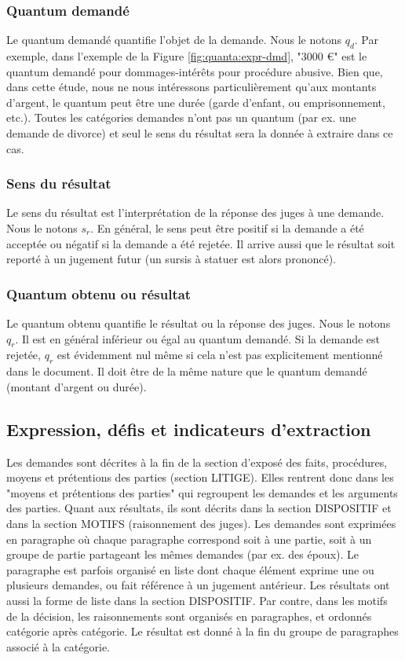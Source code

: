 \subsubsection{Quantum demandé}

Le quantum demandé quantifie l'objet de la demande. Nous le notons $q_d$. Par exemple, dans l'exemple de la Figure \ref{fig:quanta:expr-dmd}, "3000 \euro{}" est le quantum demandé pour dommages-intérêts pour procédure abusive. Bien que, dans cette étude, nous ne nous intéressons particulièrement qu'aux montants d'argent, le quantum peut être une durée (garde d'enfant, ou emprisonnement, etc.). Toutes les catégories demandes n'ont pas un quantum (par ex. une demande de divorce) et seul le sens du résultat sera la donnée à extraire dans ce cas.

\subsubsection{Sens du résultat}

Le sens du résultat est l'interprétation de la réponse des juges à une demande. Nous le notons $s_r$. En général, le sens peut être positif si la demande a été acceptée ou négatif si la demande a été rejetée. Il arrive aussi que le résultat soit reporté à un jugement futur (un sursis à statuer est alors prononcé). 

\subsubsection{Quantum obtenu ou résultat}

Le quantum obtenu quantifie le résultat ou la réponse des juges. Nous le notons $q_r$. Il est en général inférieur ou égal au quantum demandé. Si la demande est rejetée, 
$q_r$ est évidemment nul même si cela n'est pas explicitement mentionné dans le document. Il doit être de la même nature que le quantum demandé (montant d'argent ou durée).


\subsection{Expression, défis et indicateurs d'extraction}

Les demandes sont décrites à la fin de la section d'exposé des faits, procédures, moyens et prétentions des parties (section LITIGE). Elles rentrent donc dans les "moyens et prétentions des parties" qui regroupent les demandes et les arguments des parties. Quant aux résultats, ils sont décrits dans la section DISPOSITIF et dans la section MOTIFS (raisonnement des juges). Les demandes sont exprimées en paragraphe où chaque paragraphe correspond soit à une partie, soit à un groupe de partie partageant les mêmes demandes (par ex. des époux). Le paragraphe est parfois organisé en liste dont chaque élément exprime une ou plusieurs demandes, ou fait référence à un jugement antérieur. Les résultats ont aussi la forme de liste dans la section DISPOSITIF. Par contre, dans les motifs de la décision, les raisonnements sont organisés en paragraphes, et ordonnés catégorie après catégorie. Le résultat est donné à la fin du groupe de paragraphes associé à la catégorie.


